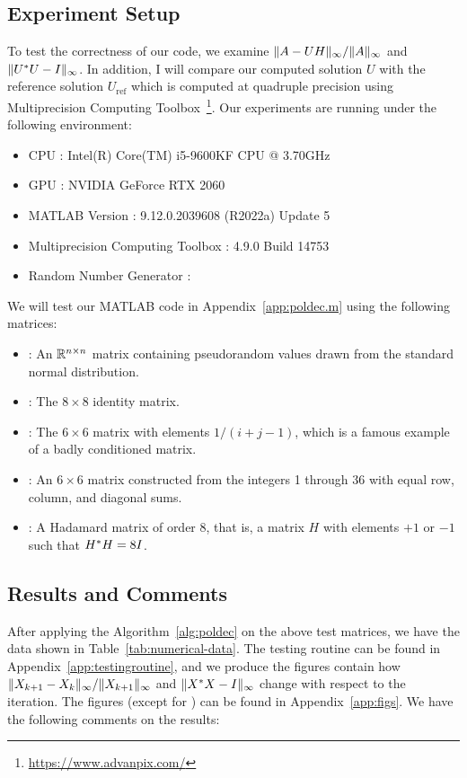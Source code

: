 \documentclass[12pt]{article}
\begin{document}
\subsection{Experiment Setup}
To test the correctness of our code, we examine $\|{A - UH}\|_{\infty}/\|{A}\|_\infty$ and $\|{U^* U - I}\|_\infty$. In addition, I will compare our computed solution $U$ with the reference solution $U_\mathrm{ref}$ which is computed at quadruple precision using Multiprecision Computing Toolbox~\footnote{\url{https://www.advanpix.com/}}.
Our experiments are running under the following environment:
\begin{itemize}
    \item CPU : Intel(R) Core(TM) i5-9600KF CPU @ 3.70GHz
    \item GPU : NVIDIA GeForce RTX 2060
    \item MATLAB Version : 9.12.0.2039608 (R2022a) Update 5
    \item Multiprecision Computing Toolbox : 4.9.0 Build 14753
    \item Random Number Generator : 
\end{itemize}

We will test our MATLAB code in Appendix~\ref{app:poldec.m} using the following matrices:
\begin{itemize}
    \item {} : An $\mathbb{R}^{n\times n}$ matrix containing pseudorandom values drawn
    from the standard normal distribution.
    \item {} : The $8\times 8$ identity matrix.
    \item {} : The $6\times 6$ matrix with elements $1/(i+j-1)$, which is a
    famous example of a badly conditioned matrix.
    \item {} : An $6\times 6$ matrix constructed from the integers
    1 through 36 with equal row, column, and diagonal sums.
    \item {} : A Hadamard matrix of order 8, that is, a matrix $H$
    with elements $+1$ or $-1$ such that $H^* H = 8I$.
\end{itemize}

\subsection{Results and Comments}
After applying the Algorithm~\ref{alg:poldec} on the above test matrices, we have the data shown in Table~\ref{tab:numerical-data}. The testing routine can be found in Appendix~\ref{app:testingroutine}, and we produce the figures contain how $\|{X_{k+1} - X_{k}}\|_\infty/\|{X_{k+1}}\|_\infty$ and $\|{X^* X - I}\|_\infty$ change with respect to the iteration. The figures (except for ) can be found in Appendix~\ref{app:figs}. We have the following comments on the results:
\end{document}
